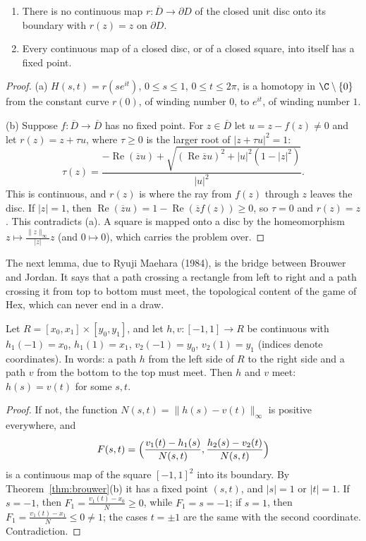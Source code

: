 \begin{theorem}\label{thm:brouwer}
\begin{enumerate}
\item[(a)] There is no continuous map $r:\overline D\to\partial D$ of the closed unit disc onto its boundary with $r(z)=z$ on $\partial D$.
\item[(b)] Every continuous map of a closed disc, or of a closed square, into itself has a fixed point.
\end{enumerate}
\end{theorem}
\begin{proof}
(a) $H(s,t)=r(se^{it})$, $0\le s\le1$, $0\le t\le2\pi$, is a homotopy in $\C\setminus\{0\}$ from the constant curve $r(0)$, of winding number $0$, to $e^{it}$, of winding number $1$.

(b) Suppose $f:\overline D\to\overline D$ has no fixed point. For $z\in\overline D$ let $u=z-f(z)\ne0$ and let $r(z)=z+\tau u$, where $\tau\ge0$ is the larger root of $|z+\tau u|^2=1$:
\[\tau(z)=\frac{-\operatorname{Re}(\overline zu)+\sqrt{(\operatorname{Re}\overline zu)^2+|u|^2(1-|z|^2)}}{|u|^2}.\]
This is continuous, and $r(z)$ is where the ray from $f(z)$ through $z$ leaves the disc. If $|z|=1$, then $\operatorname{Re}(\overline zu)=1-\operatorname{Re}(\overline zf(z))\ge0$, so $\tau=0$ and $r(z)=z$. This
contradicts (a). A square is mapped onto a disc by the homeomorphism $z\mapsto\frac{\|z\|_\infty}{|z|}z$ (and $0\mapsto0$), which carries the problem over.
\end{proof}

The next lemma, due to Ryuji Maehara (1984), is the bridge between Brouwer and Jordan. It says that a path crossing a rectangle from left to right
and a path crossing it from top to bottom must meet, the topological content of the game of Hex, which can never end in a draw.

\begin{lemma}\label{lem:crossing}
Let $R=[x_0,x_1]\times[y_0,y_1]$, and let $h,v:[-1,1]\to R$ be continuous with $h_1(-1)=x_0$, $h_1(1)=x_1$, $v_2(-1)=y_0$, $v_2(1)=y_1$ (indices denote coordinates).
In words: a path $h$ from the left side of $R$ to the right side and a path $v$ from the bottom to the top must meet. Then $h$ and $v$ meet: $h(s)=v(t)$ for some $s,t$.
\end{lemma}
\begin{proof}
If not, the function $N(s,t)=\|h(s)-v(t)\|_\infty$ is positive everywhere, and
\[F(s,t)=\Bigl(\frac{v_1(t)-h_1(s)}{N(s,t)},\frac{h_2(s)-v_2(t)}{N(s,t)}\Bigr)\]
is a continuous map of the square $[-1,1]^2$ into its boundary. By Theorem~\ref{thm:brouwer}(b) it has a fixed point $(s,t)$, and $|s|=1$ or $|t|=1$. If $s=-1$, then
$F_1=\frac{v_1(t)-x_0}N\ge0$, while $F_1=s=-1$; if $s=1$, then $F_1=\frac{v_1(t)-x_1}N\le0\ne1$; the cases $t=\pm1$ are the same with the second coordinate. Contradiction.
\end{proof}

